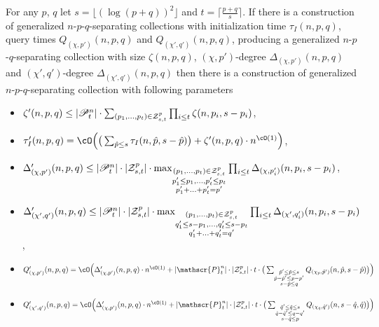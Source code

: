 \begin{lemma}\label{lem:splitSolution} For any $p$, $q$ let $s = \lfloor (\log (p+q))^2 \rfloor$ and 
$t = \lceil \frac{p+q}{s} \rceil$. If there is a construction of generalized $n$-$p$-$q$-separating collections  
with initialization time $\tau_I(n,p,q)$, query times ${Q_{({\chi},p')}}(n,p,q)$ and ${Q_{({\chi}',q')}}(n,p,q)$, 
producing a generalized $n$-$p$-$q$-separating collection with size $\zeta(n,p,q)$, $({\chi},p')$-degree 
$\Delta_{({\chi},p')}(n,p,q)$ and $({\chi}',q')$-degree $\Delta_{({\chi}',q')}(n,p,q)$ then there is a construction 
of generalized $n$-$p$-$q$-separating collection with following parameters 
\begin{itemize}\item 
$\zeta'(n,p,q) \leq |\mathscr{P}_t^n| \cdot 
\sum_{\substack{(p_1,\ldots,p_t) \in {\cal Z}_{s,t}^{p}}} \prod_{i \leq t} \zeta(n,p_i,s-p_i)$,
\item 
$\tau_I'(n,p,q) = \cO\Big(\big(\sum_{\substack{\hat{p} \leq s}} \tau_I(n,\hat{p},s-\hat{p})\big) + \zeta'(n,p,q) \cdot n^{\cO(1)}\Big)$,
\item 
$\Delta_{(\chi,p')}'(n,p,q) \leq |\mathscr{P}_t^n|\cdot |{\cal Z}_{s,t}^p|\cdot
\max_{\substack{(p_1,\ldots,p_t) \in {\cal Z}_{s,t}^{p} \\ p_1'\leq p_1,\ldots, p_t'\leq p_t \\ p_1'+\ldots+p_t'=p' }} \prod_{i \leq t}  \Delta_{({\chi},p_i')}(n,p_i,s-p_i)$,
\item 
$\Delta'_{(\chi',q')}(n,p,q) \leq |\mathscr{P}_t^n|\cdot |{\cal Z}_{s,t}^p|\cdot
\max_{\substack{(p_1,\ldots,p_t) \in {\cal Z}_{s,t}^{p} \\ q_1'\leq s-p_1,\ldots, q_t'\leq s-p_t \\ q_1'+\ldots+q_t'=q'}} \prod_{i \leq t}  \Delta_{({\chi}',q_i')}(n,p_i,s-p_i)$,
\item 
${Q'_{(\chi,p')}}(n,p,q) =\cO \Big(\Delta'_{(\chi,p')}(n,p,q) \cdot n^{\cO(1)} + |\mathscr{P}_{t}^n|\cdot |{\cal Z}_{s,t}^p| \cdot t\cdot \big( \sum_{\substack{ \hat{p}'\leq \hat{p}\leq s \\ \hat{p}-\hat{p}'\leq p-p' \\ s-\hat{p}\leq q }} Q_{(\chi_{\hat{p}},\hat{p}')}(n,\hat{p},s-\hat{p})\big)  \Big)$
\item 
${Q'_{(\chi',q')}}(n,p,q) =\cO \Big(\Delta'_{(\chi,p')}(n,p,q) \cdot n^{\cO(1)} + |\mathscr{P}_{t}^n|\cdot |{\cal Z}_{s,t}^p| \cdot t\cdot \big( \sum_{\substack{ \hat{q}'\leq \hat{q}\leq s \\ \hat{q}-\hat{q}'\leq q-q' \\ s-\hat{q} \leq p }} Q_{(\chi_{\hat{q}},\hat{q}')}(n,s-\hat{q},\hat{q})\big)  \Big)$
\end{itemize}
\end{lemma}
